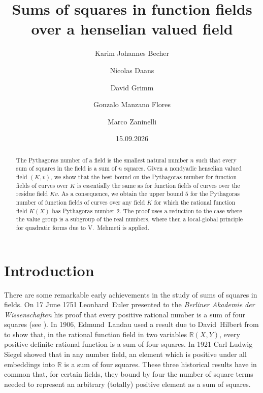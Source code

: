 \documentclass[12pt,leqno]{amsart}
\title{Sums of squares in function fields over a henselian valued field}
\date{15.09.2026}
\author[K.J.~Becher]{Karim Johannes Becher}
\author[N.~Daans]{Nicolas Daans}
\author[D.~Grimm]{David Grimm}
\author[G.~Manzano Flores]{Gonzalo Manzano Flores}
\author[M.~Zaninelli]{Marco Zaninelli}
\newcommand{\rr}{\mathbb R}
\numberwithin{equation}{section}
\theoremstyle{definition}
\theoremstyle{plain}
\begin{document}


\begin{abstract}
The Pythagoras number of a field is the smallest natural number $n$ such that every sum of squares in the field is a sum of $n$ squares. 
Given a nondyadic henselian valued field $(K, v)$, we show that the best bound on the Pythagoras number for function fields of curves over $K$ is essentially the same as for function fields of curves over the residue field $Kv$. As a consequence, we obtain the upper bound $5$ for the Pythagoras number of function fields of curves over any field $K$ for which the rational function field $K(X)$ has Pythagoras number $2$.
The proof uses a reduction to the case where the value group is a subgroup of the real numbers, where then a local-global principle for quadratic forms due to V.~Mehmeti is applied.
\end{abstract}

\maketitle

\section{Introduction} %

There are some remarkable early achievements in the study of sums of squares in fields.
On 17 June 1751 Leonhard~Euler presented to the \emph{Berliner Akademie der Wissenschaften}
his proof that every positive rational number is a sum of four squares (see \cite[p.~375]{BS07}).
In 1906, Edmund~Landau \cite{Lan06} used a result due to David~Hilbert from \cite{Hil93} to show that, in the rational function field in two variables $\rr(X,Y)$, every positive definite rational function is a sum of four squares.
In 1921 Carl Ludwig Siegel \cite{Sie21} showed that in any number field, an element which is positive under all embeddings into $\rr$ is a sum of four squares.
These three historical results have in common that, for certain fields, they bound by four the number of square terms needed to represent an arbitrary (totally) positive element as a sum of squares.
\end{document}

